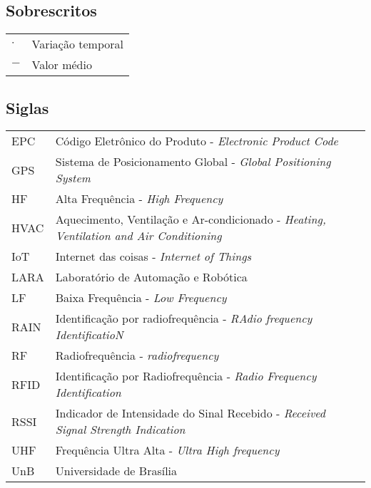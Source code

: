 \subsection*{Sobrescritos}

\begin{tabular}{p{}p{}}
$\cdot$  & Variação temporal \tabularnewline
$-$  & Valor médio \tabularnewline
\end{tabular}


\subsection*{Siglas}

\begin{tabular}{p{}p{}}
EPC  & Código Eletrônico do Produto - \textit{Electronic Product Code}\tabularnewline
GPS & Sistema de Posicionamento Global - \textit{Global Positioning System} \tabularnewline
HF & Alta Frequência - \textit{High Frequency} \tabularnewline
HVAC & Aquecimento, Ventilação e Ar-condicionado - \textit{Heating, Ventilation and Air Conditioning}\tabularnewline
IoT & Internet das coisas - \textit{Internet of Things} \tabularnewline
LARA & Laboratório de Automação e Robótica \tabularnewline
LF & Baixa Frequência - \textit{Low Frequency} \tabularnewline
RAIN & Identificação por radiofrequência - \textit{RAdio frequency IdentificatioN} \tabularnewline
RF & Radiofrequência - \textit{radiofrequency} \tabularnewline
RFID & Identificação por Radiofrequência - \textit{Radio Frequency Identification}\tabularnewline
RSSI &  Indicador de Intensidade do Sinal Recebido - \textit{Received Signal Strength Indication} \tabularnewline
UHF & Frequência Ultra Alta - \textit{Ultra High frequency} \tabularnewline
UnB & Universidade de Brasília \tabularnewline
\end{tabular}
